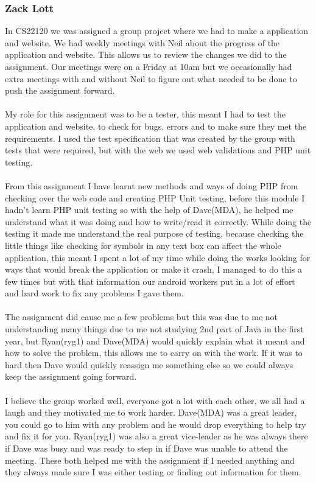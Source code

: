 \documentclass[12pt]{article}
\begin{document}
\subsubsection{Zack Lott}
In CS22120 we was assigned a group project where we had to make a application and website.
We had weekly meetings with Neil about the progress of the application and website. This allows us to review the changes we did to the assignment. Our meetings were on a Friday at 10am but we occasionally had extra meetings with and without Neil to figure out what needed to be done to push the assignment forward. 
~\\\\
My role for this assignment was to be a tester, this meant I had to test the application and website, to check for bugs, errors and to make sure they met the requirements. I used the test specification that was created by the group with tests that were required, but with the web we used web validations and PHP unit testing.
~\\\\
From this assignment I have learnt new methods and ways of doing PHP from checking over the web code and creating PHP Unit testing, before this module I hadn't learn PHP unit testing so with the help of Dave(MDA), he helped me understand what it was doing and how to write/read it correctly. While doing the testing it made me understand the real purpose of testing, because checking the little things like checking for symbols in any text box can affect the whole application, this meant I spent a lot of my time while doing the works looking for ways that would break the application or make it crash, I managed to do this a few times but with that information our android workers put in a lot of effort and hard work to fix any problems I gave them.
~\\\\
The assignment did cause me a few problems but this was due to me not understanding many things due to me not studying 2nd part of Java in the first year, but Ryan(ryg1) and Dave(MDA) would quickly explain what it meant and how to solve the problem, this allows me to carry on with the work. If it was to hard then Dave would quickly reassign me something else so we could always keep the assignment going forward.  
~\\\\
I believe the group worked well, everyone got a lot with each other, we all had a laugh and they motivated me to work harder. Dave(MDA) was a great leader, you could go to him with any problem and he would drop everything to help try and fix it for you. Ryan(ryg1) was also a great vice-leader as he was always there if Dave was busy and was ready to step in if Dave was unable to attend the meeting. These both helped me with the assignment if I needed anything and they always made sure I was either testing or finding out information for them. 
\end{document}
